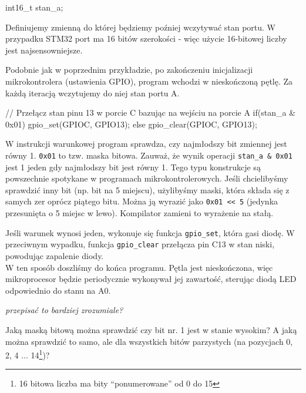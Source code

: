 \documentclass{pdfBooklets}
\begin{document}
\begin{CodeFrame*}[c]{}
  int16_t stan_a;
\end{CodeFrame*}

Definiujemy zmienną do której będziemy poźniej wczytywać stan portu. W przypadku STM32 port ma 16 bitów szerokości - więc użycie 16-bitowej liczby jest najsensowniejsze.

\begin{CodeFrame*}[c]{}
while(1){
    for (int i = 0; i < 150000; i++) __asm__("nop");
    stan_a = gpio_port_read(GPIOA);
\end{CodeFrame*}

Podobnie jak w poprzednim przykładzie, po zakończeniu inicjalizacji mikrokontrolera (ustawienia GPIO), program
wchodzi w nieskończoną pętlę. Za każdą iteracją wczytujemy do niej stan portu A. 

\begin{CodeFrame*}[c]{}
// Przełącz stan pinu 13 w porcie C bazując na wejściu na porcie A
    if(stan_a & 0x01){
      gpio_set(GPIOC, GPIO13);
    }else{
      gpio_clear(GPIOC, GPIO13);
    }
\end{CodeFrame*}

W instrukcji warunkowej program sprawdza, czy najmłodszy bit zmiennej jest równy 1. \texttt{0x01} to tzw. maska bitowa.
Zauważ, że wynik operacji \texttt{\Verb$stan_a & 0x01$} jest 1 jeden gdy najmłodszy bit jest równy 1. Tego typu
konstrukcje są powszechnie spotykane w programach mikrokontrolerowych. Jeśli chcielibyśmy sprawdzić inny bit (np. bit na 5 miejscu), użylibyśmy maski, która składa się z samych zer oprócz piątego bitu. Można ją wyrazić jako
\Verb$0x01 << 5$ (jedynka przesunięta o 5 miejsc w lewo). Kompilator zamieni to wyrażenie na stałą.

Jeśli warunek wynosi jeden, wykonuje się funkcja \Verb$gpio_set$, która gasi diodę. W przeciwnym wypadku, funkcja
\Verb$gpio_clear$ przełącza pin C13 w stan niski, powodując zapalenie diody.
\\

W ten sposób doszliśmy do końca programu. Pętla jest nieskończona, więc mikroprocesor będzie periodycznie wykonywał
jej zawartość, sterując diodą LED odpowiednio do stanu na A0.

\textit{przepisać to bardziej zrozumiale?}

\begin{Zadanie}{}{}
  Jaką maską bitową można sprawdzić czy bit nr. 1 jest w stanie wysokim? A jaką można sprawdzić to samo, ale
  dla wszystkich bitów parzystych (na pozycjach 0, 2, 4 ... 14\footnote{16 bitowa liczba ma bity ``ponumerowane'' od 0 do 15})?
\end{Zadanie}
\end{document}
